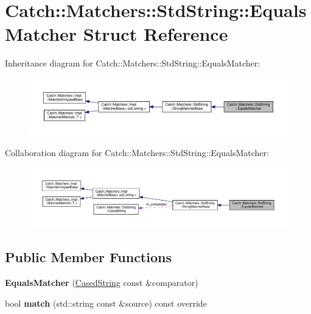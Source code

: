 \hypertarget{structCatch_1_1Matchers_1_1StdString_1_1EqualsMatcher}{}\section{Catch\+::Matchers\+::Std\+String\+::Equals\+Matcher Struct Reference}
\label{structCatch_1_1Matchers_1_1StdString_1_1EqualsMatcher}


Inheritance diagram for Catch\+::Matchers\+::Std\+String\+::Equals\+Matcher\+:
\nopagebreak
\begin{figure}[H]
\begin{center}
\leavevmode
\includegraphics[width=350pt]{structCatch_1_1Matchers_1_1StdString_1_1EqualsMatcher__inherit__graph}
\end{center}
\end{figure}


Collaboration diagram for Catch\+::Matchers\+::Std\+String\+::Equals\+Matcher\+:
\nopagebreak
\begin{figure}[H]
\begin{center}
\leavevmode
\includegraphics[width=350pt]{structCatch_1_1Matchers_1_1StdString_1_1EqualsMatcher__coll__graph}
\end{center}
\end{figure}
\subsection*{Public Member Functions}
\begin{DoxyCompactItemize}
\item 
\mbox{\label{structCatch_1_1Matchers_1_1StdString_1_1EqualsMatcher_ab740f1fb2310e9fe3fed5134d4c7e4c8}} 
{\bfseries Equals\+Matcher} (\mbox{\hyperlink{structCatch_1_1Matchers_1_1StdString_1_1CasedString}{Cased\+String}} const \&comparator)
\item 
\mbox{\label{structCatch_1_1Matchers_1_1StdString_1_1EqualsMatcher_a0bb9d64693f7bb1ef7441062d219f21a}} 
bool {\bfseries match} (std\+::string const \&source) const override
\end{DoxyCompactItemize}
